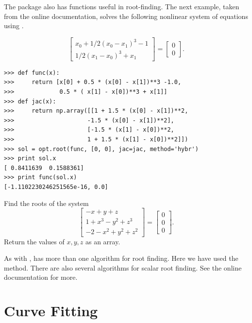 The  package also has functions useful in root-finding.
The next example, taken from the online documentation, solves the following nonlinear system of equations using .

\[
\begin{bmatrix}
	x_{0} + 1/2 ( x_{0} - x_{1} )^{3} - 1 \\
	1/2(x_{1}-x_{0})^{3} + x_{1}
\end{bmatrix} =
\begin{bmatrix}
	0 \\
	0
\end{bmatrix}.
\]

\begin{lstlisting}
>>> def func(x):
>>>     return [x[0] + 0.5 * (x[0] - x[1])**3 -1.0,
>>>             0.5 * ( x[1] - x[0])**3 + x[1]]
>>> def jac(x):
>>>     return np.array([[1 + 1.5 * (x[0] - x[1])**2,
>>>                     -1.5 * (x[0] - x[1])**2],
>>>                     [-1.5 * (x[1] - x[0])**2,
>>>                     1 + 1.5 * (x[1] - x[0])**2]])
>>> sol = opt.root(func, [0, 0], jac=jac, method='hybr')
>>> print sol.x
[ 0.8411639  0.1588361]
>>> print func(sol.x)
[-1.1102230246251565e-16, 0.0]
\end{lstlisting}

\begin{problem}
Find the roots of the system
\[
\begin{bmatrix}
	-x+y+z \\
	1+x^3-y^2+z^3\\
	-2-x^2+y^2+z^2
\end{bmatrix} =
\begin{bmatrix}
	0 \\
	0 \\
	0
\end{bmatrix} .
\]
Return the values of $x,y,z$ as an array.
\end{problem}

As with ,  has more than one algorithm for root finding.
Here we have used the  method. 
There are also several algorithms for scalar root finding. See the online documentation for more.

\section*{Curve Fitting} %


